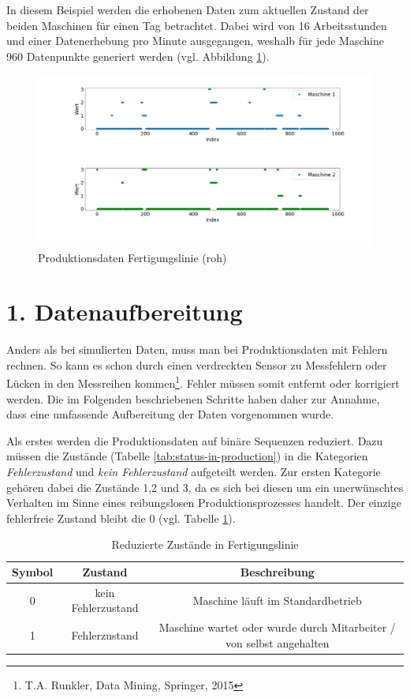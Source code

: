 In diesem Beispiel werden die erhobenen Daten zum aktuellen Zustand der beiden Maschinen für einen Tag betrachtet. Dabei wird von 16 Arbeitsstunden und einer Datenerhebung pro Minute ausgegangen, weshalb für jede Maschine 960 Datenpunkte generiert werden (vgl. Abbildung \ref{fig:raw-data}).

\begin{figure}[H]
	\centering
	\includegraphics[scale=0.32]{images/Vorgehen/raw_data}
	\caption{Produktionsdaten Fertigungslinie (roh)}
	\label{fig:raw-data}
\end{figure}

\section{1. Datenaufbereitung}
Anders als bei simulierten Daten, muss man bei Produktionsdaten mit Fehlern rechnen. So kann es schon durch einen verdreckten Sensor zu Messfehlern oder Lücken in den Messreihen kommen\footnote{T.A. Runkler, Data Mining, Springer, 2015}. Fehler müssen somit entfernt oder korrigiert werden. Die im Folgenden beschriebenen Schritte haben daher zur Annahme, dass eine umfassende Aufbereitung der Daten vorgenommen wurde.

Als erstes werden die Produktionsdaten auf binäre Sequenzen reduziert. Dazu müssen die Zustände (Tabelle \ref{tab:status-in-production}) in die Kategorien \textit{Fehlerzustand} und \textit{kein Fehlerzustand} aufgeteilt werden. Zur ersten Kategorie gehören dabei die Zustände 1,2 und 3, da es sich bei diesen um ein unerwünschtes Verhalten im Sinne eines reibungslosen Produktionsprozesses handelt. Der einzige fehlerfreie Zustand bleibt die 0 (vgl. Tabelle \ref{tab:reduced-status-in-production}).

\begin{table}
	\begin{center}
		\begin{tabular}{|c c c|} 
			\hline
			Symbol & Zustand & Beschreibung \\
			\hline\hline
			0 & kein Fehlerzustand & Maschine läuft im Standardbetrieb \\ 
			\hline
			1 & Fehlerzustand & Maschine wartet oder wurde durch Mitarbeiter / von selbst angehalten  \\
			\hline
		\end{tabular}
		\caption{Reduzierte Zustände in Fertigungslinie}
		\label{tab:reduced-status-in-production}
	\end{center}
\end{table}

